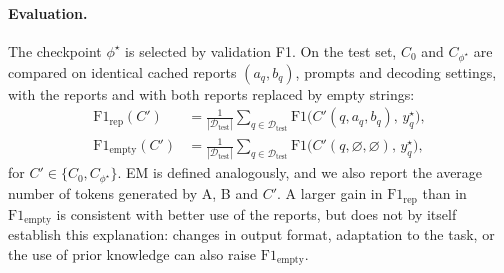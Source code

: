 \documentclass[11pt]{article}
\begin{document}
\paragraph{Evaluation.}
The checkpoint $\phi^\star$ is selected by validation F1. On the test set,
$C_0$ and $C_{\phi^\star}$ are compared on identical cached reports
$(a_q, b_q)$, prompts and decoding settings, with the reports and with both
reports replaced by empty strings:
\begin{align}
  \mathrm{F1}_{\mathrm{rep}}(C') &=
  \frac{1}{|\mathcal{D}_{\mathrm{test}}|}\sum_{q \in \mathcal{D}_{\mathrm{test}}}
  \mathrm{F1}\big(C'(q, a_q, b_q),\, y^\star_q\big),
  \label{eq:eval}\\
  \mathrm{F1}_{\mathrm{empty}}(C') &=
  \frac{1}{|\mathcal{D}_{\mathrm{test}}|}\sum_{q \in \mathcal{D}_{\mathrm{test}}}
  \mathrm{F1}\big(C'(q, \varnothing, \varnothing),\, y^\star_q\big),
  \label{eq:eval-empty}
\end{align}
for $C' \in \{C_0, C_{\phi^\star}\}$. EM is defined analogously, and we also
report the average number of tokens generated by A, B and $C'$. A larger
gain in $\mathrm{F1}_{\mathrm{rep}}$ than in $\mathrm{F1}_{\mathrm{empty}}$
is consistent with better use of the reports, but does not by itself
establish this explanation: changes in output format, adaptation to the
task, or the use of prior knowledge can also raise
$\mathrm{F1}_{\mathrm{empty}}$.
\end{document}
